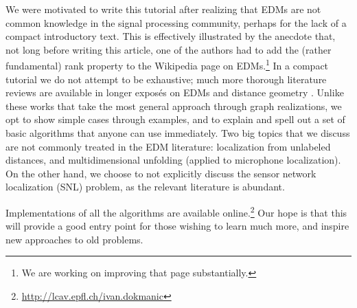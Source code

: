 \documentclass[10pt,double]{IEEEtran}
\begin{document}
We were motivated to write this tutorial after realizing that EDMs are not
common knowledge in the signal processing community, perhaps for the lack of a
compact introductory text. This is effectively illustrated by the anecdote
that, not long before writing this article, one of the authors had to add the
(rather fundamental) rank property to the Wikipedia page on EDMs.\footnote{We
are working on improving that page substantially.} In a compact tutorial we do
not attempt to be exhaustive; much more thorough literature reviews are
available in longer expos\'es on EDMs and distance geometry
\cite{Liberti:2012ut,Krislock:2012xx,Mucherino:2012hw}. Unlike these works
that take the most general approach through graph realizations, we opt to show
simple cases through examples, and to explain and spell out a set of basic
algorithms that anyone can use immediately. Two big topics that we discuss are
not commonly treated in the EDM literature: localization from unlabeled
distances, and multidimensional unfolding (applied to microphone
localization). On the other hand, we choose to not explicitly discuss the
sensor network localization (SNL) problem, as the relevant literature is
abundant.

Implementations of all the algorithms are available
online.\footnote{\url{http://lcav.epfl.ch/ivan.dokmanic}} Our hope is that
this will provide a good entry point for those wishing to learn much more, and
inspire new approaches to old problems.
\end{document}
